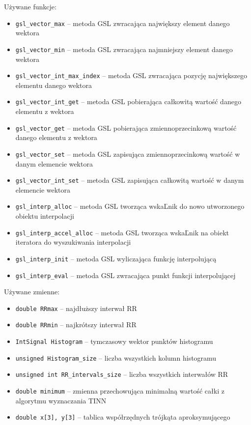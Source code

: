 \documentclass[a4paper, 11pt]{article}
\begin{document}
Używane funkcje:
\begin{itemize}
\item \verb+gsl_vector_max+ -- metoda GSL zwracająca największy element danego
wektora
\item \verb+gsl_vector_min+ -- metoda GSL zwracająca najmniejszy element danego
wektora
\item \verb+gsl_vector_int_max_index+ -- metoda GSL zwracająca pozycję największego
elementu danego wektora
\item \verb+gsl_vector_int_get+ -- metoda GSL pobierająca całkowitą wartość danego
elementu z wektora
\item \verb+gsl_vector_get+ -- metoda GSL pobierająca zmiennoprzecinkową wartość
danego elementu z wektora
\item \verb+gsl_vector_set+ -- metoda GSL zapisująca zmiennoprzecinkową wartość
w danym elemencie wektora
\item \verb+gsl_vector_int_set+ -- metoda GSL zapisująca całkowitą wartość w
danym elemencie wektora
\item \verb+gsl_interp_alloc+ -- metoda GSL tworząca wskaĽnik do nowo utworzonego
obiektu interpolacji
\item \verb+gsl_interp_accel_alloc+ -- metoda GSL tworząca wskaĽnik na obiekt
iteratora do wyszukiwania interpolacji 
\item \verb+gsl_interp_init+ -- metoda GSL wyliczająca funkcję interpolującą
\item \verb+gsl_interp_eval+ -- metoda GSL zwracająca punkt funkcji interpolującej 
\end{itemize}
\medskip{}


Używane zmienne:
\begin{itemize}
\item \verb+double RRmax+ -- najdłuższy interwał RR
\item \verb+double RRmin+ -- najkrótszy interwał RR
\item \verb+IntSignal Histogram+ -- tymczasowy wektor punktów histogramu
\item \verb+unsigned Histogram_size+ -- liczba wszystkich kolumn histogramu
\item \verb+unsigned int RR_intervals_size+ -- liczba wszystkich interwałów RR
\item \verb+double minimum+ -- zmienna przechowująca minimalną wartość całki z algorytmu
wyznaczania TINN
\item \verb+double x[3], y[3]+ -- tablica współrzędnych trójkąta aproksymującego
\end{itemize}
\end{document}
